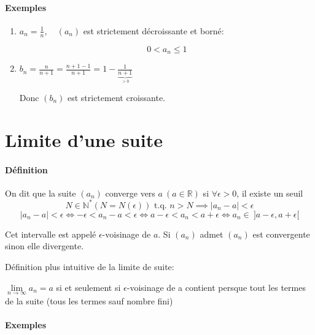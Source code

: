 \documentclass[
    11pt,
    a4paper,
    oneside,
    headinlcude, footinclude,
    twoside,
]{report}
\newcommand{\tq}[0]{\textrm{ t.q. }}
\begin{document}
\paragraph{Exemples}
\label{par:exemples}

\begin{enumerate}
\item $a_{n} = \frac{1}{n}, \quad (a_{n})$ est strictement décroissante et
borné:

$$0 < a_{n} \leq 1$$

\item $b_{n} = \frac{n}{n+1} = \frac{n+1-1}{n+1} = 1 - \frac{1}{\underbrace{n+1}_\text{$>0$}}$

Donc $(b_{n})$ est strictement croissante.
\end{enumerate}

\section{Limite d'une suite}
\label{sec:limite_d_une_suite}

\paragraph{Définition}

On dit que la suite $(a_{n})$ converge vers $a \ (a \in \mathbb{R})$ si
$\forall \epsilon > 0$, il existe un seuil $$N \in \mathbb{N} ^{\ast} (N =
N(\epsilon)) \tq n > N \implies | a_{n} - a | < \epsilon$$ $$ | a_{n} - a | <
\epsilon \iff - \epsilon < a_{n} - a < \epsilon \iff a - \epsilon < a_{n} < a
+ \epsilon \iff a_{n} \in \ ]a-\epsilon, a+\epsilon[ $$

Cet intervalle est appelé $\epsilon$-voisinage de $a$. Si $(a_{n})$ admet
$(a_{n})$ est convergente sinon elle divergente.

\pagebreak

Définition plus intuitive de la limite de suite:

$ \lim\limits_{n \rightarrow \infty} a_{n} = a $ si et seulement si
$\epsilon$-voisinage de a contient persque tout les termes de la suite (tous
les termes sauf nombre fini)

\paragraph{Exemples}
\label{par:exemples}
\end{document}
